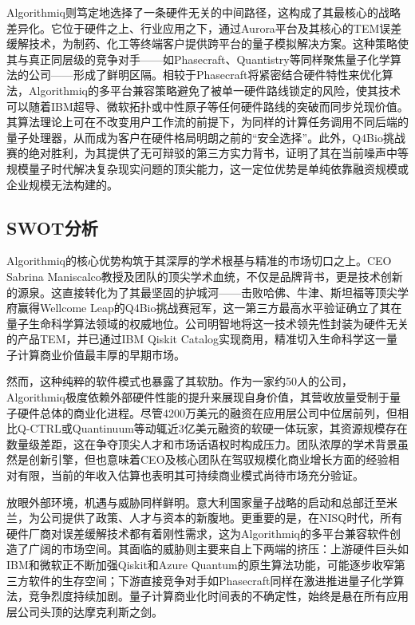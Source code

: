 \documentclass[11pt,a4paper]{ctexart}
\begin{document}
Algorithmiq则笃定地选择了一条硬件无关的中间路径，这构成了其最核心的战略差异化。它位于硬件之上、行业应用之下，通过Aurora平台及其核心的TEM误差缓解技术，为制药、化工等终端客户提供跨平台的量子模拟解决方案。这种策略使其与真正同层级的竞争对手——如Phasecraft、Quantistry等同样聚焦量子化学算法的公司——形成了鲜明区隔。相较于Phasecraft将紧密结合硬件特性来优化算法，Algorithmiq的多平台兼容策略避免了被单一硬件路线锁定的风险，使其技术可以随着IBM超导、微软拓扑或中性原子等任何硬件路线的突破而同步兑现价值。其算法理论上可在不改变用户工作流的前提下，为同样的计算任务调用不同后端的量子处理器，从而成为客户在硬件格局明朗之前的“安全选择”。此外，Q4Bio挑战赛的绝对胜利，为其提供了无可辩驳的第三方实力背书，证明了其在当前噪声中等规模量子时代解决复杂现实问题的顶尖能力，这一定位优势是单纯依靠融资规模或企业规模无法构建的。

\subsection{SWOT分析}

Algorithmiq的核心优势构筑于其深厚的学术根基与精准的市场切口之上。CEO Sabrina Maniscalco教授及团队的顶尖学术血统，不仅是品牌背书，更是技术创新的源泉。这直接转化为了其最坚固的护城河——击败哈佛、牛津、斯坦福等顶尖学府赢得Wellcome Leap的Q4Bio挑战赛冠军，这一第三方最高水平验证确立了其在量子生命科学算法领域的权威地位。公司明智地将这一技术领先性封装为硬件无关的产品TEM，并已通过IBM Qiskit Catalog实现商用，精准切入生命科学这一量子计算商业价值最丰厚的早期市场。

然而，这种纯粹的软件模式也暴露了其软肋。作为一家约50人的公司，Algorithmiq极度依赖外部硬件性能的提升来展现自身价值，其营收放量受制于量子硬件总体的商业化进程。尽管4200万美元的融资在应用层公司中位居前列，但相比Q-CTRL或Quantinuum等动辄近3亿美元融资的软硬一体玩家，其资源规模存在数量级差距，这在争夺顶尖人才和市场话语权时构成压力。团队浓厚的学术背景虽然是创新引擎，但也意味着CEO及核心团队在驾驭规模化商业增长方面的经验相对有限，当前的年收入估算也表明其可持续商业模式尚待市场充分验证。

放眼外部环境，机遇与威胁同样鲜明。意大利国家量子战略的启动和总部迁至米兰，为公司提供了政策、人才与资本的新腹地。更重要的是，在NISQ时代，所有硬件厂商对误差缓解技术都有着刚性需求，这为Algorithmiq的多平台兼容软件创造了广阔的市场空间。其面临的威胁则主要来自上下两端的挤压：上游硬件巨头如IBM和微软正不断加强Qiskit和Azure Quantum的原生算法功能，可能逐步收窄第三方软件的生存空间；下游直接竞争对手如Phasecraft同样在激进推进量子化学算法，竞争烈度持续加剧。量子计算商业化时间表的不确定性，始终是悬在所有应用层公司头顶的达摩克利斯之剑。
\end{document}

